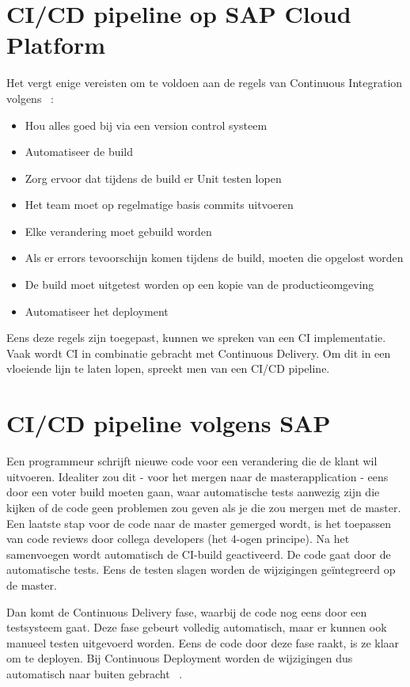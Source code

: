 \section{CI/CD pipeline op SAP Cloud Platform}
\label{sec:ci-cd-op-sap-cloud-platform}
Het vergt enige vereisten om te voldoen aan de regels van Continuous Integration volgens ~\textcite{Kramer2018}:
\begin{itemize}
    \item Hou alles goed bij via een version control systeem
    \item Automatiseer de build
    \item Zorg ervoor dat tijdens de build er Unit testen lopen
    \item Het team moet op regelmatige basis commits uitvoeren
    \item Elke verandering moet gebuild worden
    \item Als er errors tevoorschijn komen tijdens de build, moeten die opgelost worden
    \item De build moet uitgetest worden op een kopie van de productieomgeving
    \item Automatiseer het deployment
\end{itemize}
Eens deze regels zijn toegepast, kunnen we spreken van een CI implementatie.
Vaak wordt CI in combinatie gebracht met Continuous Delivery. Om dit in een vloeiende lijn te laten lopen, spreekt men van een CI/CD pipeline.

\section{CI/CD pipeline volgens SAP}
\label{sec:ci-cd-pipeling-volgens-sap}
Een programmeur schrijft nieuwe code voor een verandering die de klant wil uitvoeren. Idealiter zou dit - voor het mergen naar de masterapplication - eens door een voter build moeten gaan, waar automatische tests aanwezig zijn die kijken of de code geen problemen zou geven als je die zou mergen met de master. Een laatste stap voor de code naar de master gemerged wordt, is het toepassen van code reviews door collega developers (het 4-ogen principe).
Na het samenvoegen wordt automatisch de CI-build geactiveerd. De code gaat door de automatische tests. Eens de testen slagen worden de wijzigingen geïntegreerd op de master. 

Dan komt de Continuous Delivery fase, waarbij de code nog eens door een testsysteem gaat. Deze fase gebeurt volledig automatisch, maar er kunnen ook manueel testen uitgevoerd worden. Eens de code door deze fase raakt, is ze klaar om te deployen. 
Bij Continuous Deployment worden de wijzigingen dus automatisch naar buiten gebracht ~\autocite{Kramer2018}.

